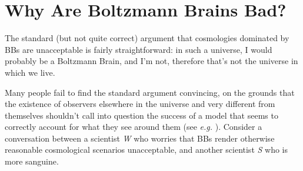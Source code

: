 \documentclass[12pt,letterpaper]{article}
\begin{document}
\section{Why Are Boltzmann Brains Bad?}

The standard (but not quite correct) argument that cosmologies dominated by BBs are unacceptable is fairly straightforward: in such a universe, I would probably be a Boltzmann Brain, and I'm not, therefore that's not the universe in which we live.

Many people fail to find the standard argument convincing, on the grounds that the existence of observers elsewhere in the universe and very different from themselves shouldn't call into question the success of a model that seems to correctly account for what they see around them (see \emph{e.g.} \cite{Banks:2002wr,Gott:2008ii}).
Consider a conversation between a scientist \emph{W} who worries that BBs render otherwise reasonable cosmological scenarios unacceptable, and another scientist \emph{S} who is more sanguine.
\end{document}
